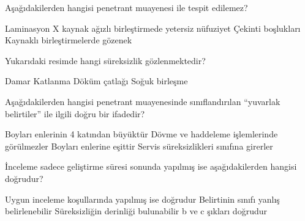 \begin{question}[subtitle=]
  Aşağıdakilerden hangisi penetrant muayenesi ile tespit edilemez?
	\begin{tasks}
          \task Laminasyon
          \task X kaynak ağızlı birleştirmede yetersiz nüfuziyet \correct
          \task Çekinti boşlukları
          \task Kaynaklı birleştirmelerde gözenek
	\end{tasks}
\end{question}
\begin{solution}
	\correct
\end{solution}

\begin{question}[subtitle=]
    	\begin{figure}[!htb]
		\centering
		\fbox{\texttt{[image: Coldshut2]}}
	\end{figure}

        Yukarıdaki resimde hangi süreksizlik gözlenmektedir?
	\begin{tasks}
          \task Damar
          \task Katlanma
          \task Döküm çatlağı
          \task Soğuk birleşme \correct
	\end{tasks}
\end{question}
\begin{solution}
	\correct
\end{solution}

\begin{question}[subtitle=]
  Aşağıdakilerden hangisi penetrant muayenesinde sınıflandırılan ``yuvarlak belirtiler'' ile ilgili doğru
  bir ifadedir?
	\begin{tasks}
          \task Boyları enlerinin 4 katından büyüktür
          \task Dövme ve haddeleme işlemlerinde görülmezler \correct
          \task Boyları enlerine eşittir
          \task Servis süreksizlikleri sınıfına girerler
	\end{tasks}
\end{question}
\begin{solution}
	\correct
\end{solution}

\begin{question}[subtitle=]
  İnceleme sadece geliştirme süresi sonunda yapılmış ise aşağıdakilerden hangisi doğrudur?
  \begin{tasks}
    \task Uygun inceleme koşullarında yapılmış ise doğrudur 
    \task Belirtinin sınıfı yanlış belirlenebilir \correct
    \task Süreksizliğin derinliği bulunabilir
    \task b ve c şıkları doğrudur
  \end{tasks}
\end{question}
\begin{solution}
	\correct
\end{solution}

